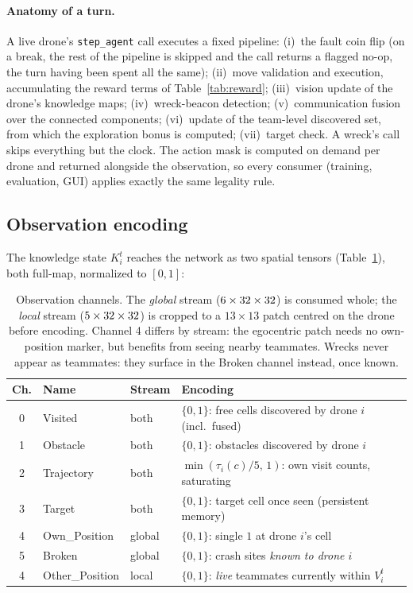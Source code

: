 \paragraph{Anatomy of a turn.}
A live drone's \texttt{step\_agent} call executes a fixed pipeline: (i)~the fault
coin flip (on a break, the rest of the pipeline is skipped and the call returns a
flagged no-op, the turn having been spent all the same); (ii)~move validation and
execution, accumulating the reward terms of Table~\ref{tab:reward};
(iii)~vision update of the drone's knowledge maps; (iv)~wreck-beacon detection;
(v)~communication fusion over the connected components; (vi)~update of the
team-level discovered set, from which the exploration bonus is computed;
(vii)~target check. A wreck's call skips everything but the clock. The action
mask is computed on demand per drone and returned alongside the observation, so
every consumer (training, evaluation, GUI) applies exactly the same legality
rule.

\subsection{Observation encoding}
\label{subsec:arch-obs}

The knowledge state $K_i^t$ reaches the network as two spatial tensors
(Table~\ref{tab:channels}), both full-map, normalized to $[0,1]$:

\begin{table}[t]
\centering
\small
\begin{tabular}{clll}
\toprule
\textbf{Ch.} & \textbf{Name} & \textbf{Stream} & \textbf{Encoding} \\
\midrule
0 & Visited        & both   & $\{0,1\}$: free cells discovered by drone $i$ (incl.\ fused) \\
1 & Obstacle       & both   & $\{0,1\}$: obstacles discovered by drone $i$ \\
2 & Trajectory     & both   & $\min(\tau_i(c)/5,\,1)$: own visit counts, saturating \\
3 & Target         & both   & $\{0,1\}$: target cell once seen (persistent memory) \\
4 & Own\_Position  & global & $\{0,1\}$: single $1$ at drone $i$'s cell \\
5 & Broken         & global & $\{0,1\}$: crash sites \emph{known to drone $i$} \\
4 & Other\_Position & local & $\{0,1\}$: \emph{live} teammates currently within $V_i^t$ \\
\bottomrule
\end{tabular}
\caption{Observation channels. The \emph{global} stream
($6\times32\times32$) is consumed whole; the \emph{local}
stream ($5\times32\times32$) is cropped to a $13\times13$
patch centred on the drone before encoding. Channel 4 differs by stream: the
egocentric patch needs no own-position marker, but benefits from seeing
nearby teammates. Wrecks never appear as teammates: they surface in the
Broken channel instead, once known.}
\label{tab:channels}
\end{table}

